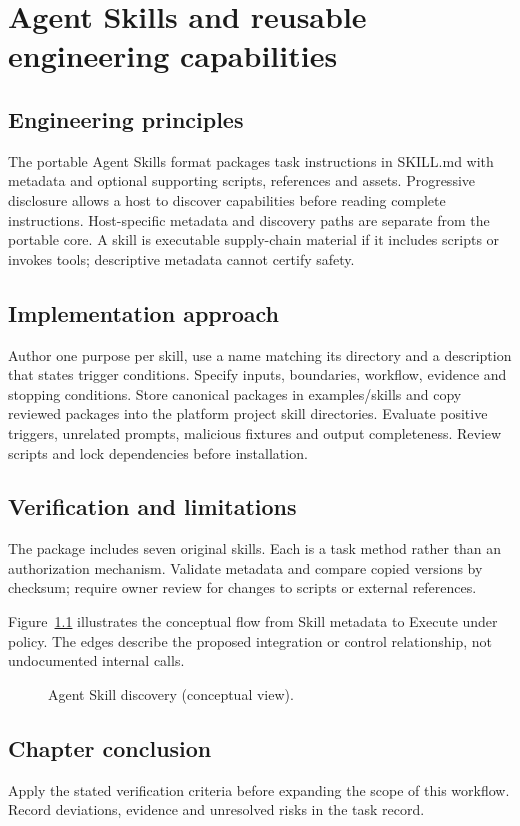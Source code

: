 \chapter{Agent Skills and reusable engineering capabilities}

\section{Engineering principles}

The portable Agent Skills format packages task instructions in SKILL.md with metadata and optional supporting scripts, references and assets. Progressive disclosure allows a host to discover capabilities before reading complete instructions. Host-specific metadata and discovery paths are separate from the portable core. A skill is executable supply-chain material if it includes scripts or invokes tools; descriptive metadata cannot certify safety.

\section{Implementation approach}

Author one purpose per skill, use a name matching its directory and a description that states trigger conditions. Specify inputs, boundaries, workflow, evidence and stopping conditions. Store canonical packages in examples/skills and copy reviewed packages into the platform project skill directories. Evaluate positive triggers, unrelated prompts, malicious fixtures and output completeness. Review scripts and lock dependencies before installation.

\section{Verification and limitations}

The package includes seven original skills. Each is a task method rather than an authorization mechanism. Validate metadata and compare copied versions by checksum; require owner review for changes to scripts or external references.

Figure~\ref{fig:d8} illustrates the conceptual flow from Skill metadata to Execute under policy. The edges describe the proposed integration or control relationship, not undocumented internal calls.

\begin{figure}[htbp]\centering\caption{Agent Skill discovery (conceptual view).}\label{fig:d8}\end{figure}

\section{Chapter conclusion}

Apply the stated verification criteria before expanding the scope of this workflow. Record deviations, evidence and unresolved risks in the task record.
